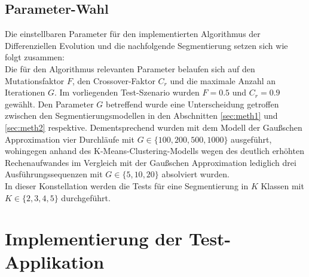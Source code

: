 		\subsection{Parameter-Wahl}
		\label{sub:de-params}
			Die einstellbaren Parameter für den implementierten Algorithmus der Differenziellen Evolution und die nachfolgende Segmentierung setzen sich wie folgt zusammen:\\
			Die für den Algorithmus relevanten Parameter belaufen sich auf den Mutationsfaktor $F$, den Crossover-Faktor $C_{r}$ und die maximale Anzahl an Iterationen $G$. Im vorliegenden Test-Szenario wurden $F = 0.5$ und $C_{r} = 0.9$ gewählt. Den Parameter $G$ betreffend wurde eine Unterscheidung getroffen zwischen den Segmentierungsmodellen in den Abschnitten \ref{sec:meth1} und \ref{sec:meth2} respektive. Dementsprechend wurden mit dem Modell der Gaußschen Approximation vier Durchläufe mit $G \in \{100, 200, 500, 1000\}$ ausgeführt, wohingegen anhand des K-Means-Clustering-Modells wegen des deutlich erhöhten Rechenaufwandes im Vergleich mit der Gaußschen Approximation lediglich drei Ausführungssequenzen mit $G \in \{5, 10, 20\}$ absolviert wurden.\\
			In dieser Konstellation werden die Tests für eine Segmentierung in $K$ Klassen mit $K \in \{2,3,4,5\}$ durchgeführt.

	\section{Implementierung der Test-Applikation}
	\label{sec:implementation}
